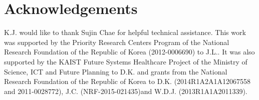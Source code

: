 \section*{Acknowledgements}

K.J. would like to thank Sujin Chae for helpful technical assistance. This work was supported by the Priority Research Centers Program of the National Research Foundation of the Republic of Korea (2012-0006690) to J.L.. It was also supported by the KAIST Future Systems Healthcare Project of the Ministry of Science, ICT and Future Planning to D.K. and grants from the National Research Foundation of the Republic of Korea to D.K. (2014R1A2A1A12067558 and 2011-0028772), J.C. (NRF-2015-021435)and W.D.J. (2013R1A1A2011339).
